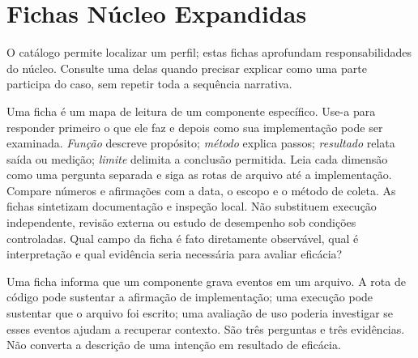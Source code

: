 
\chapter{Fichas Núcleo Expandidas}

O catálogo permite localizar um perfil; estas fichas aprofundam responsabilidades do núcleo. Consulte uma delas quando precisar explicar como uma parte participa do caso, sem repetir toda a sequência narrativa.

\label{mod12}

\roteirodidatico
{Uma ficha é um mapa de leitura de um componente específico. Use-a para responder primeiro o que ele faz e depois como sua implementação pode ser examinada.}
{\emph{Função} descreve propósito; \emph{método} explica passos; \emph{resultado} relata saída ou medição; \emph{limite} delimita a conclusão permitida.}
{Leia cada dimensão como uma pergunta separada e siga as rotas de arquivo até a implementação. Compare números e afirmações com a data, o escopo e o método de coleta.}
{As fichas sintetizam documentação e inspeção local. Não substituem execução independente, revisão externa ou estudo de desempenho sob condições controladas.}
{Qual campo da ficha é fato diretamente observável, qual é interpretação e qual evidência seria necessária para avaliar eficácia?}

{Uma ficha informa que um componente grava eventos em um arquivo. A rota de código pode sustentar a afirmação de implementação; uma execução pode sustentar que o arquivo foi escrito; uma avaliação de uso poderia investigar se esses eventos ajudam a recuperar contexto. São três perguntas e três evidências. Não converta a descrição de uma intenção em resultado de eficácia.}


